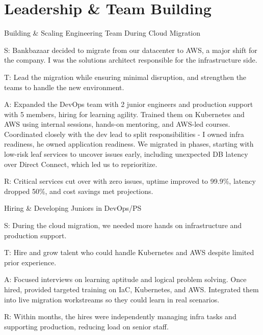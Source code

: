 \documentclass[11pt]{article}
\begin{document}
\section{Leadership \& Team Building}

\begin{starstory}{Building \& Scaling Engineering Team During Cloud Migration}
\begin{starlist}
\item[S:] Bankbazaar decided to migrate from our datacenter to AWS, a major shift for the company. I was the solutions architect responsible for the infrastructure side.
\item[T:] Lead the migration while ensuring minimal disruption, and strengthen the teams to handle the new environment.
\item[A:] Expanded the DevOps team with 2 junior engineers and production support with 5 members, hiring for learning agility. Trained them on Kubernetes and AWS using internal sessions, hands-on mentoring, and AWS-led courses. Coordinated closely with the dev lead to split responsibilities - I owned infra readiness, he owned application readiness. We migrated in phases, starting with low-risk leaf services to uncover issues early, including unexpected DB latency over Direct Connect, which led us to reprioritize.
\item[R:] Critical services cut over with zero issues, uptime improved to 99.9\%, latency dropped 50\%, and cost savings met projections.
\end{starlist}
\end{starstory}

\begin{starstory}{Hiring \& Developing Juniors in DevOps/PS}
\begin{starlist}
\item[S:] During the cloud migration, we needed more hands on infrastructure and production support.
\item[T:] Hire and grow talent who could handle Kubernetes and AWS despite limited prior experience.
\item[A:] Focused interviews on learning aptitude and logical problem solving. Once hired, provided targeted training on IaC, Kubernetes, and AWS. Integrated them into live migration workstreams so they could learn in real scenarios.
\item[R:] Within months, the hires were independently managing infra tasks and supporting production, reducing load on senior staff.
\end{starlist}
\end{starstory}
\end{document}
